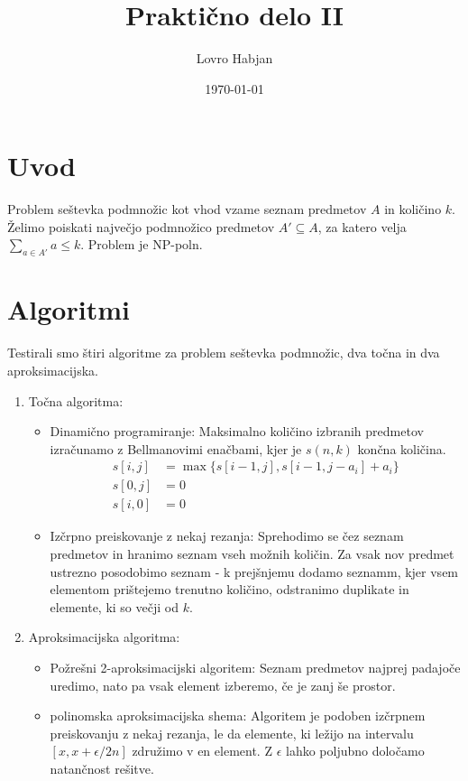 \documentclass{article}
\title{Praktično delo II}
\author{Lovro Habjan}
\date{\today}
\begin{document}
\maketitle

\section{Uvod}

Problem seštevka podmnožic kot vhod vzame seznam predmetov $A$ in količino $k$.
Želimo poiskati največjo podmnožico predmetov $A' \subseteq A$, za katero velja
$\sum_{a \in A'} a \leq k$. Problem je NP-poln.

\section{Algoritmi}

Testirali smo štiri algoritme za problem seštevka podmnožic, dva točna in dva
aproksimacijska.
\begin{enumerate}
	\item Točna algoritma:
	\begin{itemize}
		\item Dinamično programiranje: Maksimalno količino izbranih predmetov
		izračunamo z Bellmanovimi enačbami, kjer je $s(n, k)$ končna količina.
		\begin{align*}
			s[i, j] &= \max \{s[i-1, j], s[i-1, j-a_i] + a_i\} \\
			s[0, j] &= 0 \\
			s[i, 0] &= 0
		\end{align*}
		\item Izčrpno preiskovanje z nekaj rezanja: Sprehodimo se čez seznam
		predmetov in hranimo seznam vseh možnih količin. Za vsak nov predmet
		ustrezno posodobimo seznam - k prejšnjemu dodamo seznamm, kjer vsem
		elementom prištejemo trenutno količino, odstranimo duplikate in
		elemente, ki so večji od $k$.
	\end{itemize}

	\item Aproksimacijska algoritma:
	\begin{itemize}
		\item Požrešni 2-aproksimacijski algoritem: Seznam predmetov najprej
		padajoče uredimo, nato pa vsak element izberemo, če je zanj še prostor.
		\item polinomska aproksimacijska shema: Algoritem je podoben izčrpnem
		preiskovanju z nekaj rezanja, le da elemente, ki ležijo na intervalu
		$[x, x + \epsilon / 2n]$ združimo v en element. Z $\epsilon$ lahko
		poljubno določamo natančnost rešitve.
	\end{itemize}
\end{enumerate}
\end{document}
